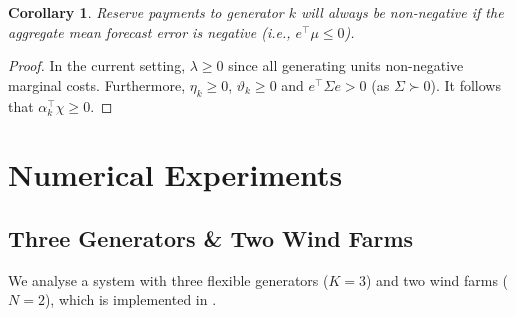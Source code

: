 \documentclass{article}
\newtheorem{corollary}{Corollary}
\begin{document}
\begin{corollary}
Reserve payments to generator $k$ will always be non-negative if the aggregate mean forecast error is negative (i.e., $e^\top \mu \le 0$).
\end{corollary}
\begin{proof}
In the current setting, $\lambda \ge 0$ since all generating units non-negative marginal costs. Furthermore, $\eta_k \ge 0$, $\vartheta_k \ge 0$ and $e^\top \Sigma e > 0$ (as $\Sigma \succ 0$). It follows that $\alpha_k^\top \chi \ge 0$.
\end{proof}


\section{Numerical Experiments}

\subsection{Three Generators \& Two Wind Farms}

We analyse a system with three flexible generators ($K = 3$) and two wind farms ($N = 2$), which is implemented in \cite{SMER2022}. 
\end{document}
